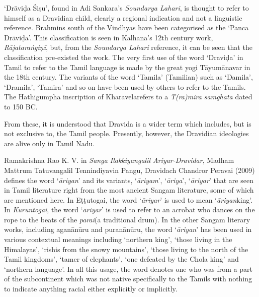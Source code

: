 ‘Drāviḍa Śiṣu’, found in Adi Sankara’s \textit{Soundarya Lahari}, is thought to refer to himself as a Dravidian child, clearly a regional indication and not a linguistic reference. Brahmins south of the Vindhyas have been categorised as the ‘Panca Drāviḍa’. This classification is seen in Kalhana’s 12th century work, \textit{Rājatarańgiņī}, but, from the \textit{Soundarya Lahari} reference, it can be seen that the classification pre-existed the work. The very first use of the word ‘Draviḍa’ in Tamil to refer to the Tamil language is made by the great yogi Tāyumānavar in the 18th century. The variants of the word ‘Tamila’ (Tamilian) such as ‘Damila’, ‘Dramila’, ‘Tamira’ and so on have been used by others to refer to the Tamils. The Hathigumpha inscription of Kharavelarefers to a \textit{T(ra)mira samghata} dated to 150 BC.

From these, it is understood that Dravida is a wider term which includes, but is not exclusive to, the Tamil people. Presently, however, the Dravidian ideologies are alive only in Tamil Nadu.

Ramakrishna Rao K. V. in \textit{Sanga Ilakkiyangalil Ariyar-Dravidar}, Madham Mattrum Tatuvangalil Tennindiyavin Pangu, Dravidach Chandror Peravai (2009) defines the word ‘\textit{āriyan}’ and its variants, ‘\textit{āriyam}’, ‘\textit{āriya}’, ‘\textit{āriyar}’ that are seen in Tamil literature right from the most ancient Sangam literature, some of which are mentioned here. In Eṭṭutogai, the word ‘\textit{āriyar}’ is used to mean ‘\textit{āriyan}king’. In \textit{Kuruntogai}, the word ‘\textit{āriyar}’ is used to refer to an acrobat who dances on the rope to the beats of the \textit{parai}(a traditional drum). In the other Sangam literary works, including aganānūru and puranānūru, the word ‘\textit{āriyan}’ has been used in various contextual meanings including ‘northern king’, ‘those living in the Himalayas’, ‘rishis from the snowy mountains’, ‘those living to the north of the Tamil kingdoms’, ‘tamer of elephants’, ‘one defeated by the Chola king’ and ‘northern language’. In all this usage, the word denotes one who was from a part of the subcontinent which was not native specifically to the Tamils with nothing to indicate anything racial either explicitly or implicitly.

